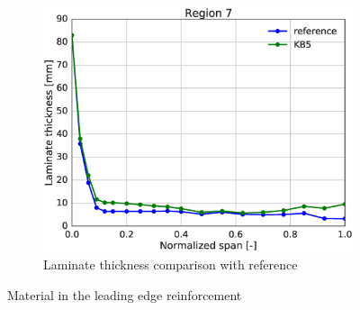 \begin{figure}[tph]
\begin{subfigure}{\textwidth}
\centering
\includegraphics[width=0.50\linewidth]{figures/KB6_final/KB5_r07_thickness.eps}
\caption{Laminate thickness comparison with reference}
\label{subfig:KB5_thick_r07}
\end{subfigure}
\caption{ Material in the leading edge reinforcement}
\label{fig:KB5_mat_r07}
\end{figure}

